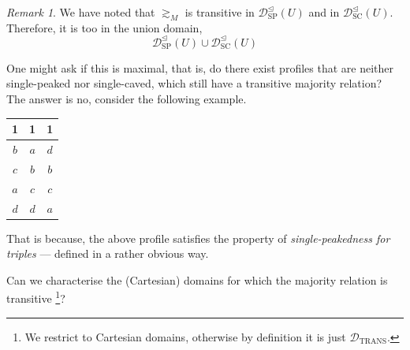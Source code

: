 \documentclass{book}
\theoremstyle{plain}
\theoremstyle{definition}
\theoremstyle{remark}
\newtheorem{remark}[theorem]{Remark}
\begin{document}
\begin{remark}
    We have noted that
    $\gtrsim_M$ is 
    transitive in 
    $\mathcal{D}_{\text{SP}}^{\trianglelefteq}(U)$
    and in 
    $\mathcal{D}_{\text{SC}}^{\trianglelefteq}(U)$.
    Therefore, it is too in the 
    union domain, 
    \[
        \mathcal{D}_{\text{SP}}^{\trianglelefteq}(U) \cup \mathcal{D}_{\text{SC}}^{\trianglelefteq}(U)
    \]

    One might ask if this is maximal, 
    that is, do there exist
    profiles that are neither 
    single-peaked nor single-caved,
    which still have a transitive 
    majority relation?
    The answer is no, 
    consider the following example.

    \begin{center}
    \begin{tabular}{|c|c|c|}
        \hline
        \textbf{1} & \textbf{1} & \textbf{1} \\
        \hline
        $b$ & $a$ & $d$ \\
        $c$ & $b$ & $b$ \\
        $a$ & $c$ & $c$ \\
        $d$ & $d$ & $a$ \\
        \hline
    \end{tabular}
    \end{center}

    That is because, the above profile 
    satisfies the 
    property of 
    \emph{single-peakedness for triples} --- defined in a rather obvious way.

    Can we characterise the (Cartesian) domains for which the 
    majority relation is transitive \footnote{
        We restrict to Cartesian domains, otherwise by definition it is 
        just $\mathcal{D}_{\text{TRANS}}$.
    }?

\end{remark}
\end{document}
